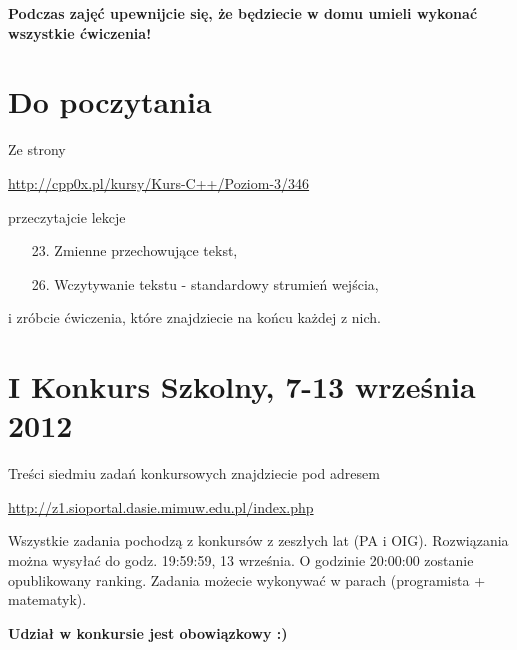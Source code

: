 \documentclass[a4paper, 11pt]{scrartcl}
\newcounter{zad}
\begin{document}
\vspace{5mm}
\begin{center}
{\bf Podczas zajęć upewnijcie się, że będziecie w domu umieli wykonać wszystkie ćwiczenia!}
\end{center}

\section*{Do poczytania}

Ze strony

\vspace{5mm}
\url{http://cpp0x.pl/kursy/Kurs-C++/Poziom-3/346}
\vspace{5mm}

\noindent
przeczytajcie lekcje

\begin{enumerate}
\item[23.] Zmienne przechowujące tekst,
\item[26.] Wczytywanie tekstu - standardowy strumień wejścia,
\end{enumerate}

\noindent
i zróbcie ćwiczenia, które znajdziecie na końcu każdej z nich.

\section*{I Konkurs Szkolny, 7-13 września 2012}


\noindent
Treści siedmiu zadań konkursowych znajdziecie pod adresem

\vspace{5mm}
\url{http://z1.sioportal.dasie.mimuw.edu.pl/index.php}

\vspace{5mm}
\noindent
Wszystkie zadania pochodzą z konkursów z zeszłych lat (PA i OIG).
Rozwiązania można wysyłać do godz. 19:59:59, 13 września. O godzinie 20:00:00 zostanie opublikowany ranking. Zadania możecie wykonywać w parach (programista + matematyk).

\vspace{5mm}
\begin{center}
{\bf Udział w konkursie jest obowiązkowy :)}
\end{center}

\end{document}
